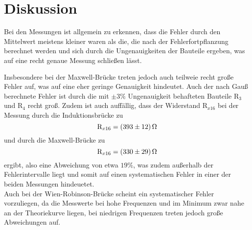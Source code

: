 \section{Diskussion}
Bei den Messungen ist allgemein zu erkennen, dass die Fehler durch den Mittelwert
meistens kleiner waren als die, die nach der Fehlerfortpflanzung berechnet werden und sich durch
die Ungenauigkeiten der Bauteile ergeben, was auf eine recht genaue Messung schließen lässt.

\noindent Insbesondere bei der Maxwell-Brücke treten jedoch auch teilweie
recht große Fehler auf, was auf eine eher geringe Genauigkeit hindeutet. Auch der nach Gauß
berechnete Fehler ist durch die mit $\pm 3 \% $ Ungenauigkeit behafteten Bauteile
$\text{R}_3 $ und $\text{R}_4 $ recht groß.
Zudem ist auch auffällig, dass der Widerstand $ \text{R}_{x16} $ bei der Messung
durch die Induktionsbrücke zu
\begin{equation*}
  \text{R}_{x16} = \SI{393 (12)}{\ohm}
\end{equation*}
und durch die Maxwell-Brücke zu
\begin{equation*}
  \text{R}_{x16} = \SI{330 (29)}{\ohm}
\end{equation*}
ergibt, also eine Abweichung von etwa $ 19 \% $, was zudem außerhalb der
Fehlerintervalle liegt und somit auf einen systematischen Fehler in einer der beiden
Messungen hindeuetet.\\
\noindent Auch bei der Wien-Robinson-Brücke scheint ein systematischer Fehler vorzuliegen,
da die Messwerte bei hohe Frequenzen und im Minimum zwar nahe an der Theoriekurve
liegen, bei niedrigen Frequenzen treten jedoch große Abweichungen auf.
